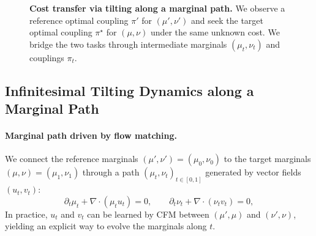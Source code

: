 \documentclass[11pt]{article}
\theoremstyle{definition}
\numberwithin{equation}{section}%
\begin{document}
\begin{figure}[htbp]

    \caption{\textbf{Cost transfer via tilting along a marginal path.}
    We observe a reference optimal coupling $\pi'$ for $(\mu',\nu')$ and seek the target optimal coupling $\pi^\star$
    for $(\mu,\nu)$ under the same unknown cost. We bridge the two tasks through intermediate marginals
    $(\mu_t,\nu_t)$ and couplings $\pi_t$.}
    \label{fig:pathwise-tilting-schematic}
\end{figure}

\subsection{Infinitesimal Tilting Dynamics along a Marginal Path}
\paragraph{Marginal path driven by flow matching.}
We connect the reference marginals $(\mu',\nu') = (\mu_0,\nu_0)$ to the target marginals $(\mu,\nu) = (\mu_1,\nu_1)$ through a path $(\mu_t,\nu_t)_{t\in[0,1]}$ generated by vector fields $(u_t,v_t)$:
\begin{equation}
\label{eq:cont-eq-uv}
\partial_t \mu_t + \nabla\!\cdot(\mu_t u_t)=0,
\qquad
\partial_t \nu_t + \nabla\!\cdot(\nu_t v_t)=0,
\end{equation}
In practice, $u_t$ and $v_t$ can be learned by CFM between $(\mu',\mu)$ and $(\nu',\nu)$, yielding an explicit way to evolve the marginals along $t$.
\end{document}
